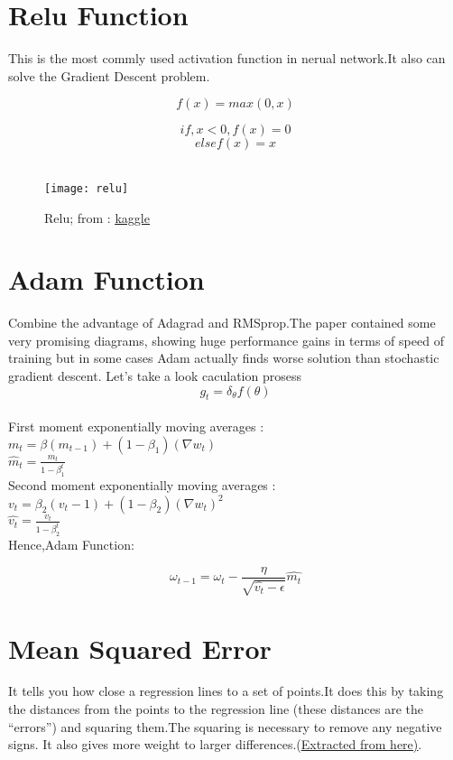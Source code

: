 \documentclass[12pt,a4paper]{article}
\begin{document}
\section{Relu Function}
This is the most commly used activation function in nerual network.It also can solve the Gradient Descent problem.
\begin{Large}$$f(x)=max(0,x)$$\end{Large}
$$if , x<0 , f(x)=0$$
$$else f(x)=x$$\\

\begin{figure}[hbt!]
\begin{center}
\texttt{[image: relu]}\\
\caption{Relu; from : \href{https://www.kaggle.com/dansbecker/rectified-linear-units-relu-in-deep-learning}{\underline{kaggle}} 
}
\end{center} 
\end{figure}

\section{Adam Function}
Combine the advantage of Adagrad and RMSprop.The paper contained some very promising diagrams, showing huge performance gains in terms of speed of training but in some cases Adam actually finds worse solution than stochastic gradient descent. Let's take a look caculation prosess \\[6pt]
$$g_t=\delta_{\theta}f(\theta)$$\\
First moment exponentially moving averages : $m_t =\beta(m_{t-1})+(1-\beta_1)(\nabla{w_t})$\\[6pt]
$\hat m_t=\frac{m_t}{1-\beta_1^t}$\\[6pt]
Second moment exponentially moving averages :$v_t=\beta_2(v_t-1)+(1-\beta_2)(\nabla{w_t})^2$\\[6pt]
$\hat{v_t}=\frac{v_t}{1-\beta_2^t}$\\[6pt]
Hence,Adam Function:\\[6pt]
\begin{Large}$$\omega_{t-1}=\omega_t-\frac{\eta}{\sqrt{\hat{v_t}-\epsilon}}\hat{m_t}$$\end{Large}
\section{Mean Squared Error}
It tells you how close a regression lines to a set of points.It does this by taking the distances from the points to the regression line (these distances are the “errors”) and squaring them.The squaring is necessary to remove any negative signs. It also gives more weight to larger differences.(\href{https://www.statisticshowto.com/mean-squared-error/}{\underline{Extracted from here)}}.\\[6pt]
\end{document}
